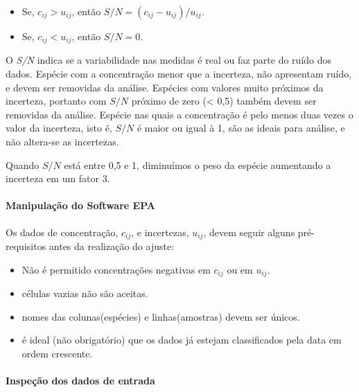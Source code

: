\begin{itemize}
  \item Se, $c_{ij} >  u_{ij}$, então $ S/N = (c_{ij} - u_{ij})/u_{ij}$.
  \item Se, $c_{ij} <  u_{ij}$, então $S/N = 0 $.
\end{itemize}

O \textit{S/N} indica se a variabilidade nas medidas é real ou faz parte do 
ruído dos dados. 
Espécie com a concentração menor que a incerteza, não apresentam ruído, e devem 
ser removidas da análise. Espécies com valores muito próximos da incerteza, 
portanto com $S/N$ próximo de zero (< 0,5) também devem ser removidas da 
análise. 
Espécie nas quais a concentração é pelo menos duas vezes o valor da incerteza, 
isto é, $S/N$ é maior ou igual à 1, são as ideais para análise, 
e não altera-se as incertezas. 

Quando $S/N$ está entre 0,5 e 1, diminuímos o peso da espécie aumentando a 
incerteza em um fator 3.  

\paragraph{Manipulação do Software EPA}

Os dados de concentração, $c_{ij}$, e incertezas, $u_{ij}$, devem seguir 
alguns pré-requisitos antes da realização do ajuste:

\begin{itemize}
  \item Não é permitido concentrações negativas em $c_{ij}$ ou em $u_{ij}$.
  \item células vazias não são aceitas.
  \item nomes das colunas(espécies) e linhas(amostras) devem ser únicos.
  \item é ideal (não obrigatório) que os dados já estejam classificados 
        pela data em ordem crescente.
\end{itemize}

\paragraph{Inspeção dos dados de entrada}

